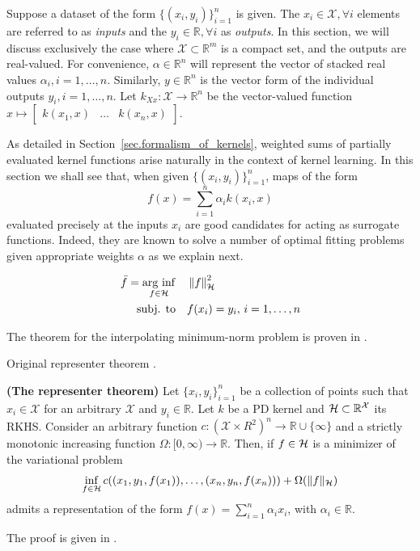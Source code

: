 Suppose a dataset of the form $\{(x_i,y_i)\}_{i=1}^n$ is given. The $x_i \in \mathcal{X}, \forall i$ elements are referred to as \textit{inputs} and the $y_i \in \mathbb{R}, \forall i$ as \textit{outputs}. In this section, we will discuss exclusively the case where $\mathcal{X} \subset \mathbb{R}^m$ is a compact set, and the outputs are real-valued. For convenience, $\alpha \in \mathbb{R}^n$ will represent the vector of stacked real values $\alpha_i, i=1,\dots,n$. Similarly, $y \in \mathbb{R}^n$ is the vector form of the individual outputs $y_i,i=1,\dots,n$. Let $k_{Xx} : \mathcal{X} \rightarrow \mathbb{R}^n$ be the vector-valued function $x \mapsto \begin{bmatrix} k(x_1,x) & \dots & k(x_n,x)\end{bmatrix}$.

As detailed in Section~\ref{sec.formalism_of_kernels}, weighted sums of partially evaluated kernel functions arise naturally in the context of kernel learning. In this section we shall see that, when given $\{(x_i,y_i)\}_{i=1}^n$, maps of the form
\begin{equation}
	f(x) = \sum_{i=1}^n \alpha_i k(x_i,x)
\end{equation}
evaluated precisely at the inputs $x_i$ are good candidates for acting as surrogate functions. Indeed, they are known to solve a number of optimal fitting problems given appropriate weights $\alpha$ as we explain next.

\begin{align}
		\bar{f} = \operatorname*{\arg\,\inf}_{f \in \mathcal{H}} & \quad \left\| f \right\|_\mathcal{H}^2 \\
		\text{subj. to} & \quad f(x_i) = y_i, \, i = 1,\dots,n 
\end{align}

The theorem for the interpolating minimum-norm problem is proven in \cite[Theorem~3.5]{kanagawa2018gaussian}.

Original representer theorem \cite{kimeldorf1971some}.

\begin{theorem}
	\textbf{(The representer theorem)}
	Let $\{x_i,y_i\}_{i=1}^n$ be a collection of points such that $x_i \in \mathcal{X}$ for an arbitrary $\mathcal{X}$ and $y_i \in \mathbb{R}$. Let $k$ be a PD kernel and $\mathcal{H} \subset \mathbb{R}^\mathcal{X}$ its RKHS. Consider an arbitrary function $c : (\mathcal{X} \times R^2)^n \rightarrow \mathbb{R} \cup \{\infty\}$ and a strictly monotonic increasing function $\Omega: [0,\infty) \rightarrow \mathbb{R}$. Then, if $f \in \mathcal{H}$ is a minimizer of the variational problem
	\begin{equation}
		\label{eq.representer_theorem_general_loss}
		\inf_{f\in \mathcal{H}} c((x_1,y_1,f(x_1)),\dots,(x_n,y_n,f(x_n))) + \Omega(\Vert f \Vert_{\mathcal{H}})
	\end{equation}
	admits a representation of the form $f(x) = \sum_{i=1}^n \alpha_i x_i$, with $\alpha_i \in \mathbb{R}$. 
\end{theorem}
\begin{my_proof}
	The proof is given in \cite{scholkopf2001generalized}.
\end{my_proof}

